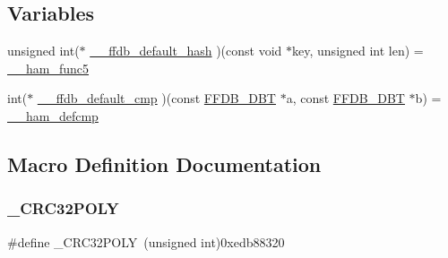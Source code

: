 \subsection*{Variables}
\begin{DoxyCompactItemize}
\item 
unsigned int($\ast$ \mbox{\hyperlink{adat-devel_2other__libs_2filedb_2filehash_2ffdb__hash__func_8c_a8dbb63e1cad3f3b74feb88774094ac90}{\+\_\+\+\_\+ffdb\+\_\+default\+\_\+hash}} )(const void $\ast$key, unsigned int len) = \mbox{\hyperlink{adat__devel_2other__libs_2filedb_2filehash_2ffdb__hash__func_8h_a81a42d643c836f388d6dc040e4b9b4c6}{\+\_\+\+\_\+ham\+\_\+func5}}
\item 
int($\ast$ \mbox{\hyperlink{adat-devel_2other__libs_2filedb_2filehash_2ffdb__hash__func_8c_a95a05878af50da44152ad314a956b048}{\+\_\+\+\_\+ffdb\+\_\+default\+\_\+cmp}} )(const \mbox{\hyperlink{adat-devel_2other__libs_2filedb_2filehash_2ffdb__db_8h_aa2e0984399491df0fdd20898ca8758f9}{F\+F\+D\+B\+\_\+\+D\+BT}} $\ast$a, const \mbox{\hyperlink{adat-devel_2other__libs_2filedb_2filehash_2ffdb__db_8h_aa2e0984399491df0fdd20898ca8758f9}{F\+F\+D\+B\+\_\+\+D\+BT}} $\ast$b) = \mbox{\hyperlink{adat__devel_2other__libs_2filedb_2filehash_2ffdb__hash__func_8h_a84933d22e6744fb559a08e95010872e6}{\+\_\+\+\_\+ham\+\_\+defcmp}}
\end{DoxyCompactItemize}


\subsection{Macro Definition Documentation}
\mbox{\label{adat-devel_2other__libs_2filedb_2filehash_2ffdb__hash__func_8c_a7fdf299d5deb2577876427d08aa22999}} 
\subsubsection{\texorpdfstring{\_CRC32POLY}{\_CRC32POLY}}
{\footnotesize\ttfamily \#define \+\_\+\+C\+R\+C32\+P\+O\+LY~(unsigned int)0xedb88320}

\mbox{\label{adat-devel_2other__libs_2filedb_2filehash_2ffdb__hash__func_8c_ae15122ac6220a318b9ef4749a126cf68}} 
